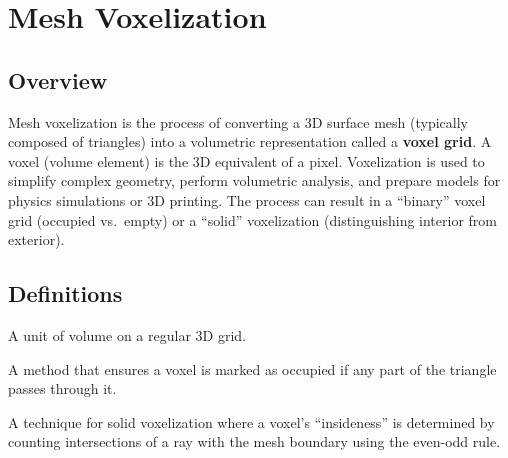 \section{Mesh Voxelization}
\label{sec:mesh_voxelization}

\subsection{Overview}
Mesh voxelization is the process of converting a 3D surface mesh (typically composed of triangles) into a volumetric representation called a \textbf{voxel grid}\cite{akeninemoller2001,nooruddin2003}. A voxel (volume element) is the 3D equivalent of a pixel. Voxelization is used to simplify complex geometry, perform volumetric analysis, and prepare models for physics simulations or 3D printing. The process can result in a ``binary'' voxel grid (occupied vs.\ empty) or a ``solid'' voxelization (distinguishing interior from exterior).

\subsection{Definitions}
\begin{definition}[Voxel]\label{def:voxel}
A unit of volume on a regular 3D grid.
\end{definition}

\begin{definition}\label{def:conservative_voxelization}
A method that ensures a voxel is marked as occupied if any part of the triangle passes through it.
\end{definition}

\begin{definition}\label{def:parity_rule}
A technique for solid voxelization where a voxel's ``insideness'' is determined by counting intersections of a ray with the mesh boundary using the even-odd rule.
\end{definition}

